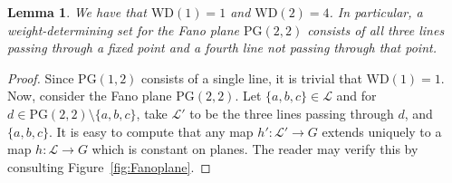 \documentclass{article}
\newtheorem{lemma}[theorem]{Lemma}
\theoremstyle{remark}
\theoremstyle{definition}
\begin{document}
\begin{lemma}\label{lem:BCWD} We have that $\mathrm{WD}(1)=1$ and $\mathrm{WD}(2)=4$. In particular, a weight-determining set for the Fano plane $\mathrm{PG}(2,2)$ consists of all three lines passing through a fixed point and a fourth line not passing through that point.
\end{lemma}
\begin{proof} Since $\mathrm{PG}(1, 2)$ consists of a single line, it is trivial that $\mathrm{WD}(1)=1$. Now, consider the Fano plane $\mathrm{PG}(2, 2)$. Let $\{a,b,c\}\in\mathcal{L}$ and for $d\in \mathrm{PG}(2, 2)\setminus\{a,b,c\}$, take $\mathcal{L}'$ to be the three lines passing through $d$, and $\{a,b,c\}$. It is easy to compute that any map $h':\mathcal{L}'\to G$ extends uniquely to a map $h:\mathcal{L}\to G$ which is constant on planes. The reader may verify this by consulting Figure~\ref{fig:Fanoplane}. 
\end{proof}
\end{document}
